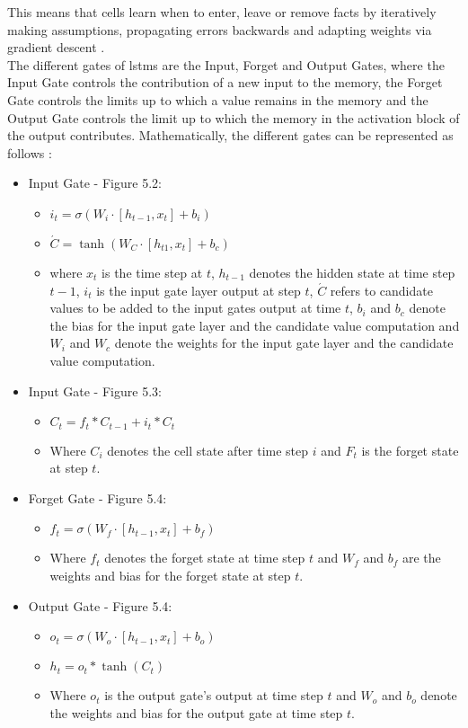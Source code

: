 \documentclass[a4paper, 11pt,titlepage,oneside,openany]{book}
\begin{document}
\newpage 
\noindent This means that cells learn when to enter, leave or remove facts by iteratively making assumptions, propagating errors backwards and adapting weights via gradient descent \cite{lstm}.\\
\indent The different gates of \gls{lstm}s are the Input, Forget and Output Gates, where the Input Gate controls the contribution of a new input to the memory, the Forget Gate controls the limits up to which a value remains in the memory and the Output Gate controls the limit up to which the memory in the activation block of the output contributes. Mathematically, the different gates can be represented as follows \cite{rnn}: 
\begin{itemize}
	\item Input Gate - Figure 5.2: 
	\begin{itemize}
		\item $i_t=\sigma(W_i \cdot [h_{t-1}, x_t]+b_i)$
		\item $\acute{C}=\tanh(W_C \cdot [h_{t1}, x_t]+b_c)$
		\item where $x_t$ is the time step at $t$, $h_{t-1}$ denotes the hidden state at time step $t-1$, $i_t$ is the input gate layer output at step $t$, $\acute{C}$ refers to candidate values to be added to the input gates output at time $t$, $b_i$ and $b_c$ denote the bias for the input gate layer and the candidate value computation and $W_i$ and $W_c$ denote the weights for the input gate layer and the candidate value computation.
	\end{itemize}	
	\item  Input Gate - Figure 5.3:
	\begin{itemize}
		\item $C_t=f_t*C_{t-1}+i_t*C_t$
		\item Where $C_i$ denotes the cell state after time step $i$ and $F_t$ is the forget state at step $t$.
	\end{itemize}
	\newpage
	\item Forget Gate - Figure 5.4:
	\begin{itemize}
		\item $f_t=\sigma(W_f \cdot [h_{t-1}, x_t]+b_f)$
		\item Where $f_t$ denotes the forget state at time step $t$ and $W_f$ and $b_f$ are the weights and bias for the forget state at step $t$.
	\end{itemize}
	\item Output Gate - Figure 5.4:
	\begin{itemize}
		\item $o_t=\sigma(W_o \cdot [h_{t-1},x_t]+b_o)$
		\item $h_t=o_t*\tanh(C_t)$
		\item Where $o_t$ is the output gate's output at time step $t$ and $W_o$ and $b_o$ denote the weights and bias for the output gate at time step $t$.
	\end{itemize}
\end{itemize}
\end{document}
